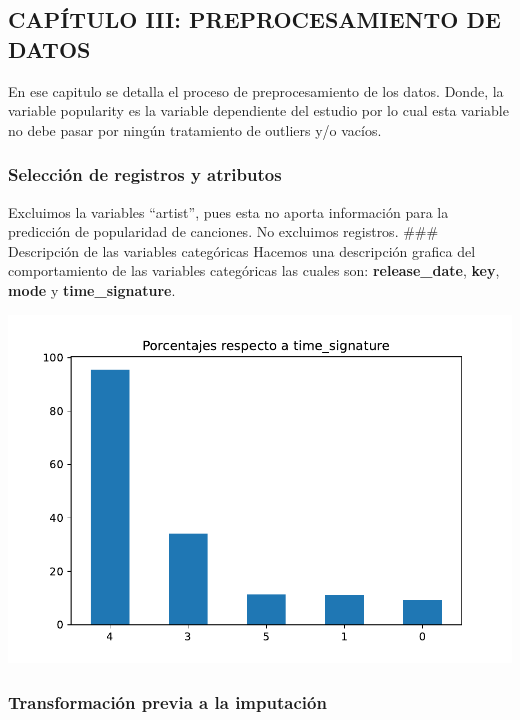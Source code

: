 \documentclass[
  letterpaper,
  DIV=11,
  numbers=noendperiod]{scrartcl}
\begin{document}
\hypertarget{capuxedtulo-iii-preprocesamiento-de-datos}{%
\subsection{CAPÍTULO III: PREPROCESAMIENTO DE
DATOS}\label{capuxedtulo-iii-preprocesamiento-de-datos}}

En ese capitulo se detalla el proceso de preprocesamiento de los datos.
Donde, la variable popularity es la variable dependiente del estudio por
lo cual esta variable no debe pasar por ningún tratamiento de outliers
y/o vacíos.

\hypertarget{selecciuxf3n-de-registros-y-atributos}{%
\subsubsection{Selección de registros y
atributos}\label{selecciuxf3n-de-registros-y-atributos}}

Excluimos la variables ``artist'', pues esta no aporta información para
la predicción de popularidad de canciones. No excluimos registros.
\#\#\# Descripción de las variables categóricas Hacemos una descripción
grafica del comportamiento de las variables categóricas las cuales son:
\textbf{release\_date}, \textbf{key}, \textbf{mode} y
\textbf{time\_signature}.

\includegraphics{informe_01_files/figure-pdf/unnamed-chunk-30-21.pdf}

\hypertarget{transformaciuxf3n-previa-a-la-imputaciuxf3n}{%
\subsubsection{Transformación previa a la
imputación}\label{transformaciuxf3n-previa-a-la-imputaciuxf3n}}
\end{document}
